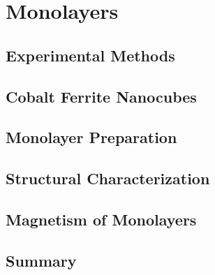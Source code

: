 \documentclass[\main/dresen_thesis.tex]{subfiles}
\renewcommand{\thisPath}{\main/chapters/monolayers}
\begin{document}
  \chapter{Monolayers}\label{ch:monolayers}
    

    \section{Experimental Methods}
      
        \FloatBarrier
        \clearpage

    \section{Cobalt Ferrite Nanocubes}
      
        \FloatBarrier
        \clearpage

    \section{Monolayer Preparation}
      
      \FloatBarrier
      \clearpage

    \section{Structural Characterization}
      
      \FloatBarrier

    \section{Magnetism of Monolayers}
      
      \FloatBarrier

    \section{Summary}
      
      \FloatBarrier
\end{document}
